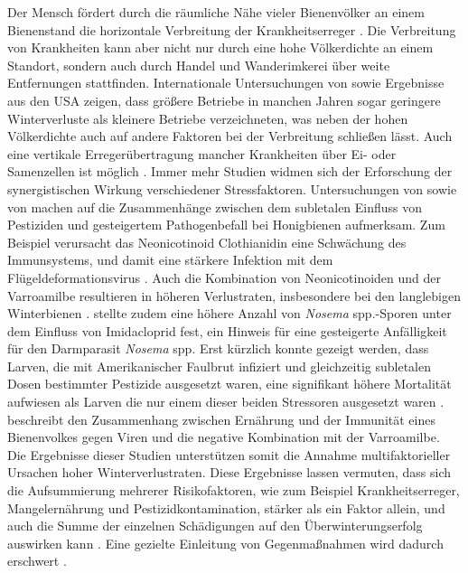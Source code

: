 Der Mensch fördert durch die räumliche Nähe vieler Bienenvölker an einem Bienenstand die horizontale Verbreitung der Krankheitserreger \citep{fries2001, seeley2015, forfert2016}. Die Verbreitung von Krankheiten kann aber nicht nur durch eine hohe Völkerdichte an einem Standort, sondern auch durch Handel und Wanderimkerei über weite Entfernungen stattfinden. Internationale Untersuchungen von \cite{vanderzee2012, vanderzee2014} sowie Ergebnisse aus den USA \citep{steinhauer2014,lee2015} zeigen, dass größere Betriebe in manchen Jahren sogar geringere Winterverluste als kleinere Betriebe verzeichneten, was neben der hohen Völkerdichte auch auf andere Faktoren bei der Verbreitung schließen lässt. Auch eine vertikale Erregerübertragung mancher Krankheiten über Ei- oder Samenzellen ist möglich \citep{fries2001, peng2015, yue2007}.
\newline
Immer mehr Studien widmen sich der Erforschung der synergistischen Wirkung verschiedener Stressfaktoren. Untersuchungen von \cite{pettis2012, diprisco2013} sowie von \cite{alburaki2017} machen auf die Zusammenhänge zwischen dem subletalen Einfluss von Pestiziden und gesteigertem Pathogenbefall bei Honigbienen aufmerksam. Zum Beispiel verursacht das Neonicotinoid Clothianidin eine Schwächung des Immunsystems, und damit eine stärkere Infektion mit dem Flügeldeformationsvirus \citep{diprisco2013}. Auch die Kombination von Neonicotinoiden und der Varroamilbe resultieren in höheren Verlustraten, insbesondere bei den langlebigen Winterbienen \citep{straub2019}. \cite{pettis2012} stellte zudem eine höhere Anzahl von \textit{Nosema} spp.-Sporen unter dem Einfluss von Imidacloprid fest, ein Hinweis für eine gesteigerte Anfälligkeit für den Darmparasit \textit{Nosema} spp. Erst kürzlich konnte gezeigt werden, dass Larven, die mit Amerikanischer Faulbrut infiziert und gleichzeitig subletalen Dosen bestimmter Pestizide ausgesetzt waren, eine signifikant höhere Mortalität aufwiesen als Larven die nur einem dieser beiden Stressoren ausgesetzt waren \citep{lopez2017}. \cite{degrandi-hoffman2015} beschreibt den Zusammenhang zwischen Ernährung und der Immunität eines Bienenvolkes gegen Viren und die negative Kombination mit der Varroamilbe. Die Ergebnisse dieser Studien unterstützen somit die Annahme multifaktorieller Ursachen hoher Winterverlustraten. Diese Ergebnisse lassen vermuten, dass sich die Aufsummierung mehrerer Risikofaktoren, wie zum Beispiel Krankheitserreger, Mangelernährung und Pestizidkontamination, stärker als ein Faktor allein, und auch die Summe der einzelnen Schädigungen auf den Überwinterungserfolg auswirken kann \citep{goulson2015,barroso-arevalo2019}. Eine gezielte Einleitung von Gegenmaßnahmen wird dadurch erschwert \citep{brodschneider2013}.
